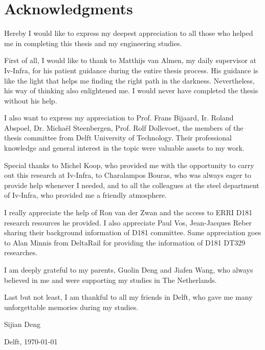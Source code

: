 \documentclass{report}
\begin{document}
\chapter*{Acknowledgments}

Hereby I would like to express my deepest appreciation to all those who helped me in completing this thesis and my engineering studies.

First of all, I would like to thank to Matthijs van Almen, my daily supervisor at Iv-Infra, for his patient guidance during the entire thesis process. His guidance is like the light that helps me finding the right path in the darkness. Nevertheless, his way of thinking also enlightened me. I would never have completed the thesis without his help. 

I also want to express my appreciation to Prof. Frans Bijaard, Ir. Roland Abspoel, Dr. Micha{\"e}l Steenbergen, Prof. Rolf Dollevoet,  the members of the thesis committee from Delft University of Technology. Their professional knowledge and general interest in the topic were valuable assets to my work.

Special thanks to Michel Koop, who provided me with the opportunity to carry out this research at Iv-Infra, to Charalampos Bouras, who was always eager to provide help whenever I needed, and to all the colleagues at the steel department of Iv-Infra, who provided me a friendly atmosphere.

I really appreciate the help of Ron van der Zwan and the access to ERRI D181 research resources he provided. I also appreciate Paul Vos, Jean-Jacques Reber sharing their background information of D181 committee. Same appreciation goes to Alan Minnis from DeltaRail for providing the information of D181 DT329 researches.

I am deeply grateful to my parents, Guolin Deng and Jiafen Wang, who always believed in me and were supporting my studies in The Netherlands. 

Last but not least, I am thankful to all my friends in Delft, who gave me many unforgettable memories during my studies.

\vspace*{1cm}

Sijian Deng

Delft,  \today


\tableofcontents
\listoffigures
\listoftables

















% 

% 



 

\end{document}
